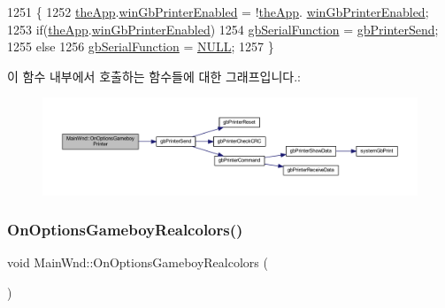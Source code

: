 \begin{DoxyCode}
1251 \{
1252   \mbox{\hyperlink{_v_b_a_8cpp_a8095a9d06b37a7efe3723f3218ad8fb3}{theApp}}.\mbox{\hyperlink{class_v_b_a_ad02c13c4fea97781a17ca6c9f9cdaa49}{winGbPrinterEnabled}} = !\mbox{\hyperlink{_v_b_a_8cpp_a8095a9d06b37a7efe3723f3218ad8fb3}{theApp}}.
      \mbox{\hyperlink{class_v_b_a_ad02c13c4fea97781a17ca6c9f9cdaa49}{winGbPrinterEnabled}};
1253   \textcolor{keywordflow}{if}(\mbox{\hyperlink{_v_b_a_8cpp_a8095a9d06b37a7efe3723f3218ad8fb3}{theApp}}.\mbox{\hyperlink{class_v_b_a_ad02c13c4fea97781a17ca6c9f9cdaa49}{winGbPrinterEnabled}})
1254     \mbox{\hyperlink{gb_globals_8cpp_a824d706a8d4285ee024bfd05a69e47e4}{gbSerialFunction}} = \mbox{\hyperlink{gb_printer_8cpp_ad92e246f72a463f50f3c0856418e087e}{gbPrinterSend}};
1255   \textcolor{keywordflow}{else}
1256     \mbox{\hyperlink{gb_globals_8cpp_a824d706a8d4285ee024bfd05a69e47e4}{gbSerialFunction}} = \mbox{\hyperlink{getopt1_8c_a070d2ce7b6bb7e5c05602aa8c308d0c4}{NULL}};
1257 \}
\end{DoxyCode}
이 함수 내부에서 호출하는 함수들에 대한 그래프입니다.\+:
\nopagebreak
\begin{figure}[H]
\begin{center}
\leavevmode
\includegraphics[width=350pt]{class_main_wnd_a5909d22b4cea6315004fc60b0f997b23_cgraph}
\end{center}
\end{figure}
\mbox{\label{class_main_wnd_a3c22c4fc314110e06499edd9028ad033}} 
\subsubsection{\texorpdfstring{On\+Options\+Gameboy\+Realcolors()}{OnOptionsGameboyRealcolors()}}
{\footnotesize\ttfamily void Main\+Wnd\+::\+On\+Options\+Gameboy\+Realcolors (\begin{DoxyParamCaption}{ }\end{DoxyParamCaption})\hspace{0.3cm}{\ttfamily [protected]}}



